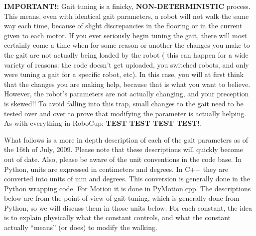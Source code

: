 \documentclass[11pt]{article}
\begin{document}
{\bf IMPORTANT!:} Gait tuning is a finicky, {\bf NON-DETERMINISTIC}
process. This means, even with identical gait parameters, a robot will not
walk the same way each time, because of slight discrepancies in the flooring
or in the current given to each motor.  If you ever seriously begin tuning
the gait, there will most certainly come a time when for some reason or another
the changes you make to the gait are not actually being loaded by the robot (
this can happen for a wide variety of reasons: the code doesn't get uploaded,
you switched robots, and only were tuning a gait for a specific robot, etc).
In this case, you will at first think that the changes you are making help,
because that is what you want to believe. However, the robot's parameters are
not actually changing, and your preception is skewed!! To avoid falling
into this trap, small changes to the gait need to be tested over and over to
prove that modifying the parameter is actually helping. As with everything in
RoboCup: {\bf TEST TEST TEST TEST!}.


What follows is a more in depth description of each of the gait parameters
as of the 16th of July, 2009. Please note that these descriptions will quickly
become out of date. Also, please be aware of the unit conventions in the code
base. In Python, units are expressed in centimeters and degrees. In C++ they
are converted into units of mm and degrees.  This conversion is generally done
in the Python wrapping code. For Motion it is done in PyMotion.cpp.
The descriptions below are from the point of view of gait tuning, which is
generally done from Python, so we will discuss them in those units below.
For each constant, the idea is to explain physically what the constant
controls, and what the constant actually ``means'' (or does) to modify the
walking.
\end{document}
